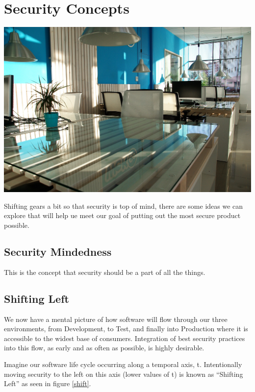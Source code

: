 \chapter{Security Concepts}

\includegraphics[scale=0.85]{images/office-space-1744803_1920.jpg}

\justifying
Shifting gears a bit so that security is top of mind, there are some ideas we can explore that will help ue meet our goal of 
putting out the most secure product possible.

\section{Security Mindedness}

\justifying
This is the concept that security should be a part of all the things.

\section{Shifting Left}

\justifying
We now have a mental picture of how software will flow through our three environments, from
Development, to Test, and finally into Production where it is accessible to the widest
base of consumers. Integration of best security practices into this flow, as early and as often
as possible, is highly desirable.

\justifying
Imagine our software life cycle occurring along a temporal axis, t. Intentionally moving security to the
left on this axis (lower values of t) is known as ``Shifting Left'' as seen
in figure \ref{shift}.

